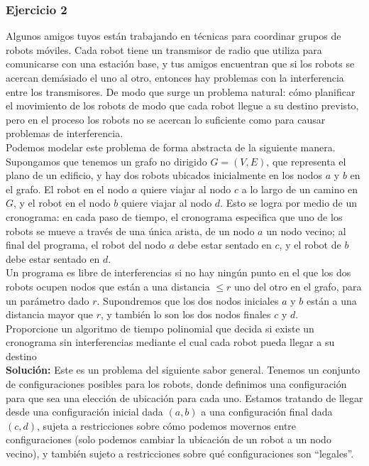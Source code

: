 \documentclass[a4paper, 12pt]{book}
\theoremstyle{dotless}
\begin{document}
\subsubsection*{Ejercicio 2}

Algunos amigos tuyos están trabajando en técnicas para coordinar grupos de robots móviles. Cada robot tiene un transmisor de radio que utiliza para comunicarse con una estación base, y tus amigos encuentran que si los robots se acercan demásiado el uno al otro, entonces hay problemas con la interferencia entre los transmisores. De modo que surge un problema natural: cómo planificar el movimiento de los robots de modo que cada robot llegue a su destino previsto, pero en el proceso los robots no se acercan lo suficiente como para causar problemas de interferencia.\\

Podemos modelar este problema de forma abstracta de la siguiente manera. Supongamos que tenemos un grafo no dirigido $G =(V, E)$, que representa el plano de un edificio, y hay dos robots ubicados inicialmente en los nodos $a$ y $b$ en el grafo. El robot en el nodo $a$ quiere viajar al nodo $c$ a lo largo de un camino en $G$, y el robot en el nodo $b$ quiere viajar al nodo $d$. Esto se logra por medio de un cronograma: en cada paso de tiempo, el cronograma especifica que uno de los robots se mueve a través de una única arista, de un nodo $a$ un nodo vecino; al final del programa, el robot del nodo $a$ debe estar sentado en $c$, y el robot de $b$ debe estar sentado en $d$.\\

Un programa es libre de interferencias si no hay ningún punto en el que los dos robots ocupen nodos que están a una distancia $≤ r$ uno del otro en el grafo, para un parámetro dado $r$. Supondremos que los dos nodos iniciales $a$ y $b$ están a una distancia mayor que $r$, y también lo son los dos nodos finales $c$ y $d$.\\

Proporcione un algoritmo de tiempo polinomial que decida si existe un cronograma sin interferencias mediante el cual cada robot pueda llegar a su destino\\

\textbf{Solución:} Este es un problema del siguiente sabor general. Tenemos un conjunto de configuraciones posibles para los robots, donde definimos una configuración para que sea una elección de ubicación para cada uno. Estamos tratando de llegar desde una configuración inicial dada $(a,b)$ a una configuración final dada $(c,d)$, sujeta a restricciones sobre cómo podemos movernos entre configuraciones (solo podemos cambiar la ubicación de un robot a un nodo vecino), y también sujeto a restricciones sobre qué configuraciones son ``legales''.\\
\end{document}
